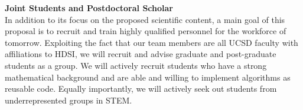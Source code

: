 \documentclass{article}
\begin{document}



%
%
\smallskip
{\bf Joint Students and Postdoctoral Scholar}\\
In addition to its focus on the proposed scientific content, a main goal of this proposal is to recruit and train highly qualified personnel for the workforce of tomorrow. Exploiting the fact that our team members are all UCSD faculty with affiliations to HDSI, we will recruit and advise graduate and post-graduate students as a
group. We will actively recruit students who have a strong
mathematical background and are able and willing to implement
algorithms as reusable code. Equally importantly, we will actively seek out students from underrepresented groups in STEM. 
\end{document}
